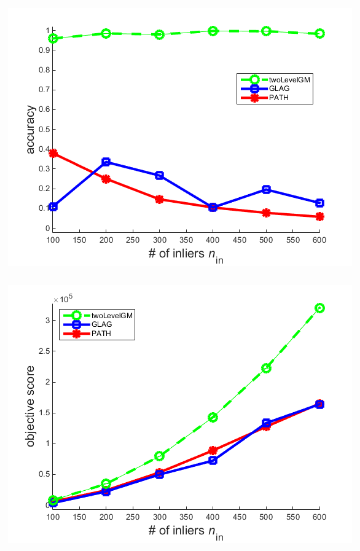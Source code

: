 \begin{figure}[h] 
		\begin{subfigure}[b]{0.33\textwidth}
			\centering
			\includegraphics[scale=0.25]{"chapter3/fig/SyntheticTest_BigGraphs/descr/Results_v4.3.3/Test3/accuracy_avg1t"} 
		\end{subfigure}
		\begin{subfigure}[b]{0.33\textwidth}
			\centering
			\includegraphics[scale=0.25]{"chapter3/fig/SyntheticTest_BigGraphs/descr/Results_v4.3.3/Test3/score_avg1t"} 
		\end{subfigure} 
		\begin{subfigure}[b]{0.32\textwidth}
			\centering

\end{subfigure}
\end{figure}
